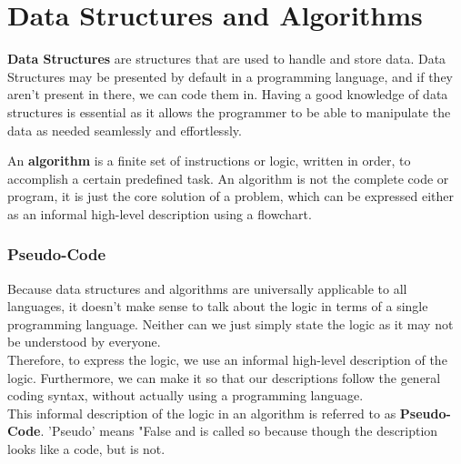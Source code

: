 
\section{Data Structures and Algorithms}
\label{DSA}
 \textbf{Data Structures} are structures that are used to handle and store data. Data Structures may be presented by default in a programming language, and if they aren't present in there, we can code them in. Having a good knowledge of data structures is essential as it allows the programmer to be able to manipulate the data as needed seamlessly and effortlessly.\par
\vspace{3.5mm}
An \textbf{algorithm} is a finite set of instructions or logic, written in order, to accomplish a certain predefined task. An algorithm is not the complete code or program, it is just the core solution of a problem, which can be expressed either as an informal high-level description using a flowchart.

\subsubsection*{Pseudo-Code}
Because data structures and algorithms are universally applicable to all languages, it doesn't make sense to talk about the logic in terms of a single programming language. Neither can we just simply state the logic as it may not be understood by everyone. \\
Therefore, to express the logic, we use an informal high-level description of the logic. Furthermore, we can make it so that our descriptions follow the general coding syntax, without actually using a programming language.\\
This informal description of the logic in an algorithm is referred to as \textbf{Pseudo-Code}. 'Pseudo' means "False and is called so because though the description looks like a code, but is not.

